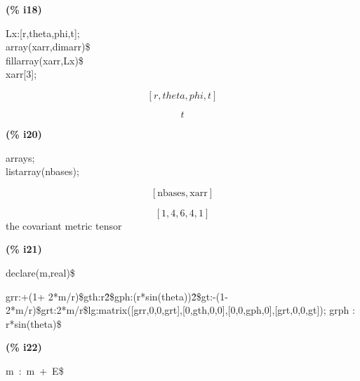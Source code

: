 \documentclass[fleqn]{article}
\begin{document}
\noindent%



\noindent
\begin{minipage}[t]{4.000000em}\color{red}\bfseries
(\% i18)	
\end{minipage}
\begin{minipage}[t]{\textwidth}\color{blue}
Lx:[r,theta,phi,t];\\
array(xarr,dimarr)\$\\
fillarray(xarr,Lx)\$\\
xarr[3];
\end{minipage}
\[\displaystyle \tag{\% o15} 
\left[ r\mathop{,}theta\mathop{,}phi\mathop{,}t\right] \mbox{}\]

\[\tag{\% o18} 
t\mbox{}
\]


\noindent
\begin{minipage}[t]{4.000000em}\color{red}\bfseries
(\% i20)	
\end{minipage}
\begin{minipage}[t]{\textwidth}\color{blue}
arrays;\\
listarray(nbases);
\end{minipage}
\[\displaystyle \tag{\% o19} 
\left[ \ensuremath{\mathrm{nbases}}\mathop{,}\ensuremath{\mathrm{xarr}}\right] \mbox{}\]

\[\tag{\% o20} 
\left[ 1\mathop{,}4\mathop{,}6\mathop{,}4\mathop{,}1\right] \mbox{}
\]
the covariant metric tensor


\noindent
\begin{minipage}[t]{4.000000em}\color{red}\bfseries
(\% i21)	
\end{minipage}
\begin{minipage}[t]{\textwidth}\color{blue}
declare(m,real)\$
\end{minipage}

\noindent%

grr:+(1+ 2*m/r)\$gth:r\^ 2\$gph:(r*sin(theta))\^ 2\$gt:-(1-2*m/r)\$grt:2*m/r\$lg:matrix([grr,0,0,grt],[0,gth,0,0],[0,0,gph,0],[grt,0,0,gt]);
grph : r*sin(theta)\$


\noindent
\begin{minipage}[t]{4.000000em}\color{red}\bfseries
(\% i22)	
\end{minipage}
\begin{minipage}[t]{\textwidth}\color{blue}
m\ :\ m\ +\ E\$
\end{minipage}
\end{document}
